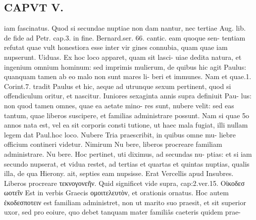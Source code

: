\documentclass{article}
\begin{document}
\begin{pages}
\section*{CAPVT  V. }
\marginpar{[ p.299 ]}iam fascinatus. Quod si secundae nuptiae non dam nantur, nec tertiae Aug. lib. de fide ad Petr. cap.3. in fine. Bernard.ser. 66. cantic. eam quoque sen- tentiam refutat quae vult honestiora esse inter vir gines connubia, quam quae iam nupserunt. Uiduas. Ex hoc loco apparet, quam sit lasci- uiae dedita natura, et ingenium omnium hominum: sed imprimis mulierum, de quibus hic agit Paulus: quanquam tamen ab eo malo non sunt mares li- beri et immunes. Nam et quae.1. Corint.7. tradit Paulus et hic, aeque ad utrunque sexum pertinent, quod si offendiculum oritur, et nascitur. Iuniores sexaginta annis supra definiuit Pau- lus: non quod tamen omnes, quae ea aetate mino- res sunt, nubere velit: sed eas tantum, quae liberos suscipere, et familias administrare possunt. Nam si quae 5o annos nata est, vel ea sit corporis consti tutione, ut haec mala fugiat, illi nullam legem dat Paul.hoc loco. Nubere Tria praescribit, in quibus omne mu- liebre officium contineri videtur. Nimirum Nu bere, liberos procreare familiam administrare. Nu bere. Hoc pertinet, uti diximus, ad secundas nu- ptias: et si iam secundo nupserat, et vidua restet, ad tertias et quartas et quintas nuptias, qualis illa, de qua Hierony. ait, septies eam nupsisse. Erat Vercellis apud Insubres. Liberos procreare τεκνογονεῆν. Quid significet vide supra, cap:2.ver.15. Oἰκοδεσ ωοτεῖν Est in verbis Graecis ομοιτελευτὸν, et orationis ornatus. Hoc autem ἐκοδεσποτειν est familiam administret, non ut marito suo praesit, et sit superior uxor, sed pro eoiure, quo debet tanquam mater familiâs caeteris quidem prae- 

\end{pages}
\end{document}
